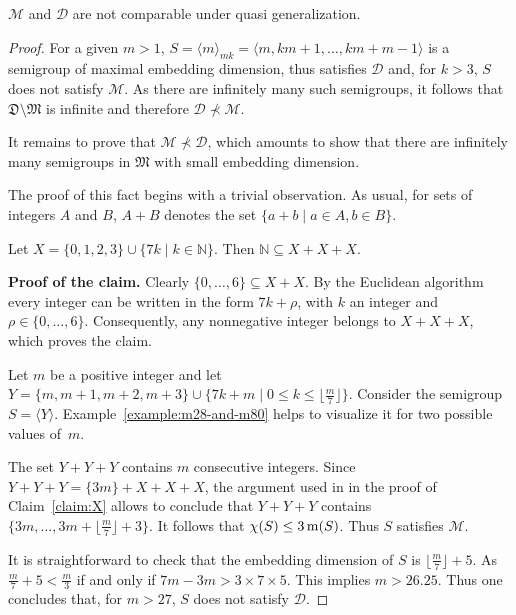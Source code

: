 \begin{proposition}\label{prop:M-D-non-comparable}
	$\mathcal{M}$ and $\mathcal{D}$ are not comparable under quasi generalization.
\end{proposition}
\begin{proof}
	For a given $m>1$, $S= \langle m\rangle_{mk}=
	\langle m, km+1,\ldots,km+m-1\rangle$ is a semigroup of maximal embedding dimension, thus satisfies $\mathcal{D}$ and, for $k > 3$, $S$ does not satisfy $\mathcal{M}$. As there are infinitely many such semigroups, it follows that $\mathfrak{D}\setminus\mathfrak{M}$ is infinite and therefore $\mathcal{D}\nprec\mathcal{M}$.
	
	It remains to prove that $\mathcal{M}\nprec\mathcal{D}$, which amounts to show that there are infinitely many semigroups in $\mathfrak{M}$ with small embedding dimension.
	
	The proof of this fact begins with a trivial observation. As usual, for sets of integers $A$ and $B$, $A+B$ denotes the set $\{a+b\mid a\in A, b\in B\}$. 
	\begin{claim}\label{claim:X}
		Let $X =\{0,1,2,3\}\cup \{7k\mid k\in \mathbb{N}\}$. Then $\mathbb{N}\subseteq X+X+X$.
	\end{claim}
	\textbf{Proof of the claim.}
		Clearly $\{0,\ldots,6\}\subseteq X+X$.
		By the Euclidean algorithm every integer can be written in the form $7k+\rho$, with $k$ an integer and $\rho\in \{0,\ldots,6\}$. Consequently, any nonnegative integer belongs to $X+X+X$, which proves the claim.
	\medskip

	Let $m$ be a positive integer and let $Y=\{m, m+1,m+2,m+3\}\cup \{7k+m\mid 0\le k\le \lfloor \frac{m}{7}\rfloor\}$. Consider the semigroup $S=\langle Y\rangle$. Example~\ref{example:m28-and-m80} helps to visualize it for two possible values of~$m$.
	
	The set $Y+Y+Y$ contains $m$ consecutive integers. Since $Y+Y+Y=\{3m\}+X+X+X$, the argument used in in the proof of Claim~\ref{claim:X} allows to conclude that $Y+Y+Y$ contains $\big\{3m,\ldots,3m+\lfloor \frac{m}{7}\rfloor+3\big\}$. It follows that $\operatorname{\chi}(S)\le 3\operatorname{m}(S)$. Thus $S$ satisfies $\mathcal{M}$.
	
	It is straightforward to check that the embedding dimension of $S$ is $\lfloor\frac{m}{7}\rfloor+5$.
	As $\frac{m}{7}+5<\frac{m}{3}$ if and only if $7m-3m > 3\times 7\times 5$. This implies $m > 26.25$. Thus one concludes that, for $m>27$, $S$ does not satisfy $\mathcal{D}$.
\end{proof}	
